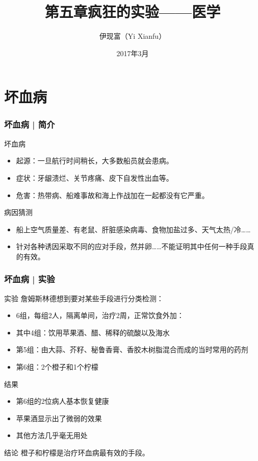 



\title[医学]{第五章\quad 疯狂的实验——医学}
\author[Yixf]{伊现富（Yi Xianfu）}
\date{2017年3月}



\section{坏血病}
\begin{frame}
  \frametitle{坏血病 | 简介}
  \begin{block}{坏血病}
    \begin{itemize}
      \item 起源：一旦航行时间稍长，大多数船员就会患病。
      \item 症状：牙龈溃烂、关节疼痛、皮下自发性出血等。
      \item 危害：热带病、船难事故和海上作战加在一起都没有它严重。
    \end{itemize}
  \end{block}
  \pause
  \begin{block}{病因猜测}
    \begin{itemize}
      \item 船上空气质量差、有老鼠、肝脏感染病毒、食物加盐过多、天气太热/冷……
      \item 针对各种诱因采取不同的应对手段，然并卵……不能证明其中任何一种手段真的有效。
    \end{itemize}
  \end{block}
\end{frame}

\begin{frame}
  \frametitle{坏血病 | 实验}
  \begin{block}{实验}
    詹姆斯\textbullet 林德想到要对某些手段进行分类检测：
    \begin{itemize}
      \item 6组，每组2人，隔离单间，治疗2周，正常饮食外加：
      \item 其中4组：饮用苹果酒、醋、稀释的硫酸以及海水
      \item 第5组：由大蒜、芥籽、秘鲁香膏、香胶木树脂混合而成的当时常用的药剂
      \item 第6组：2个橙子和1个柠檬
    \end{itemize}
  \end{block}
  \pause
  \begin{block}{结果}
    \begin{itemize}
      \item 第6组的2位病人基本恢复健康
      \item 苹果酒显示出了微弱的效果
      \item 其他方法几乎毫无用处
    \end{itemize}
  \end{block}
  \pause
  \begin{block}{结论}
    橙子和柠檬是治疗环血病最有效的手段。
  \end{block}
\end{frame}

